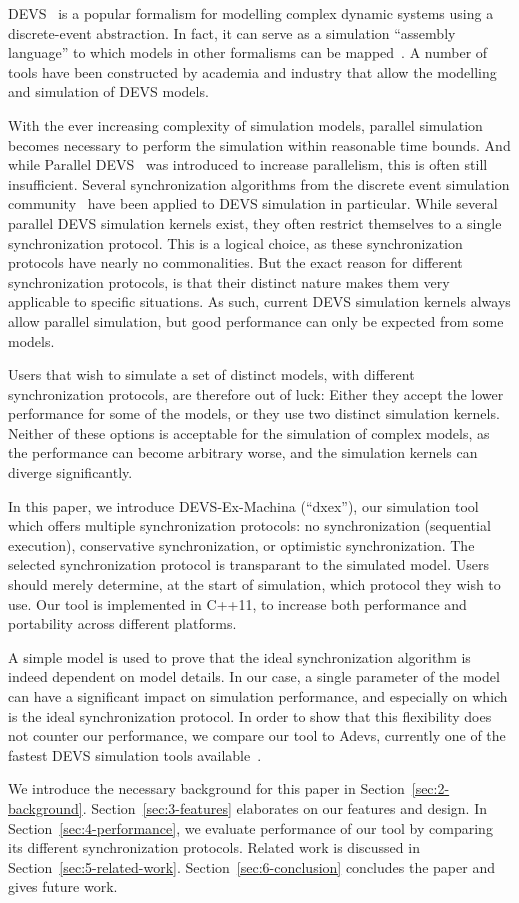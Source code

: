 \textsf{DEVS}~\cite{CDEVS} is a popular formalism for modelling complex dynamic systems using a discrete-event abstraction.
In fact, it can serve as a simulation ``assembly language'' to which models in other formalisms can be mapped~\cite{DEVSbase}.
A number of tools have been constructed by academia and industry that allow the modelling and simulation of \textsf{DEVS} models.

With the ever increasing complexity of simulation models, parallel simulation becomes necessary to perform the simulation within reasonable time bounds.
And while \textsf{Parallel DEVS}~\cite{PDEVS} was introduced to increase parallelism, this is often still insufficient.
Several synchronization algorithms from the discrete event simulation community~\cite{FujimotoBook} have been applied to \textsf{DEVS} simulation in particular.
While several parallel \textsf{DEVS} simulation kernels exist, they often restrict themselves to a single synchronization protocol.
This is a logical choice, as these synchronization protocols have nearly no commonalities.
But the exact reason for different synchronization protocols, is that their distinct nature makes them very applicable to specific situations.
As such, current \textsf{DEVS} simulation kernels always allow parallel simulation, but good performance can only be expected from some models.

Users that wish to simulate a set of distinct models, with different synchronization protocols, are therefore out of luck:
Either they accept the lower performance for some of the models, or they use two distinct simulation kernels.
Neither of these options is acceptable for the simulation of complex models, as the performance can become arbitrary worse, and the simulation kernels can diverge significantly.

In this paper, we introduce DEVS-Ex-Machina (``dxex''), our simulation tool which offers multiple synchronization protocols: no synchronization (sequential execution), conservative synchronization, or optimistic synchronization.
The selected synchronization protocol is transparant to the simulated model.
Users should merely determine, at the start of simulation, which protocol they wish to use.
Our tool is implemented in C++11, to increase both performance and portability across different platforms.

A simple model is used to prove that the ideal synchronization algorithm is indeed dependent on model details.
In our case, a single parameter of the model can have a significant impact on simulation performance, and especially on which is the ideal synchronization protocol.
In order to show that this flexibility does not counter our performance, we compare our tool to Adevs, currently one of the fastest \textsf{DEVS} simulation tools available~\cite{PythonPDEVS1}.

We introduce the necessary background for this paper in Section~\ref{sec:2-background}.
Section~\ref{sec:3-features} elaborates on our features and design.
In Section~\ref{sec:4-performance}, we evaluate performance of our tool by comparing its different synchronization protocols.
Related work is discussed in Section~\ref{sec:5-related-work}.
Section~\ref{sec:6-conclusion} concludes the paper and gives future work.
